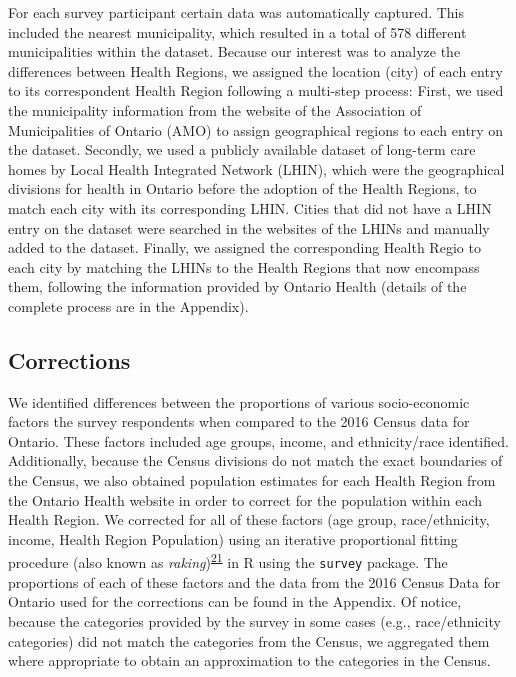 \documentclass[
  letterpaper,
  DIV=11,
  numbers=noendperiod]{scrartcl}
\begin{document}
For each survey participant certain data was automatically captured.
This included the nearest municipality, which resulted in a total of 578
different municipalities within the dataset. Because our interest was to
analyze the differences between Health Regions, we assigned the location
(city) of each entry to its correspondent Health Region following a
multi-step process: First, we used the municipality information from the
website of the Association of Municipalities of Ontario (AMO) to assign
geographical regions to each entry on the dataset. Secondly, we used a
publicly available dataset of long-term care homes by Local Health
Integrated Network (LHIN), which were the geographical divisions for
health in Ontario before the adoption of the Health Regions, to match
each city with its corresponding LHIN. Cities that did not have a LHIN
entry on the dataset were searched in the websites of the LHINs and
manually added to the dataset. Finally, we assigned the corresponding
Health Regio to each city by matching the LHINs to the Health Regions
that now encompass them, following the information provided by Ontario
Health (details of the complete process are in the Appendix).

\hypertarget{corrections}{%
\subsection{Corrections}\label{corrections}}

We identified differences between the proportions of various
socio-economic factors the survey respondents when compared to the 2016
Census data for Ontario. These factors included age groups, income, and
ethnicity/race identified. Additionally, because the Census divisions do
not match the exact boundaries of the Census, we also obtained
population estimates for each Health Region from the Ontario Health
website in order to correct for the population within each Health
Region. We corrected for all of these factors (age group,
race/ethnicity, income, Health Region Population) using an iterative
proportional fitting procedure (also known as
\emph{raking})\textsuperscript{\protect\hyperlink{ref-deming1940}{21}}
in R using the \texttt{survey} package. The proportions of each of these
factors and the data from the 2016 Census Data for Ontario used for the
corrections can be found in the Appendix. Of notice, because the
categories provided by the survey in some cases (e.g., race/ethnicity
categories) did not match the categories from the Census, we aggregated
them where appropriate to obtain an approximation to the categories in
the Census.
\end{document}
